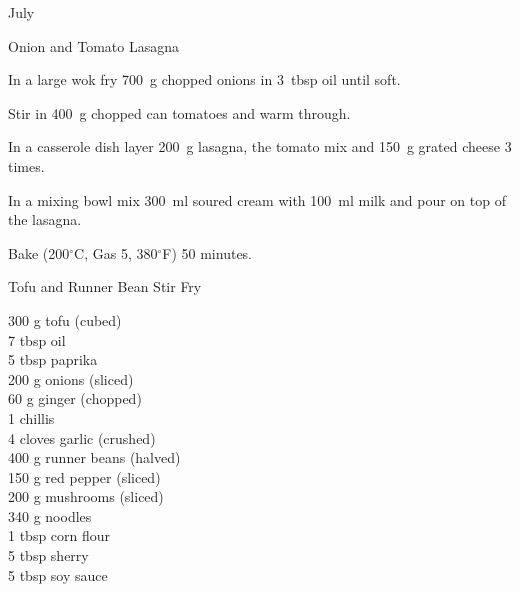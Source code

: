 \begin{menu}{July}
\begin{recipe}{2}{Onion and Tomato Lasagna}
\begin{ingredients}
		\end{ingredients}
	
	
	
    \begin{instructions}
    \item 
        In a large wok fry
        700~g chopped onions
        in
        3~tbsp  oil
        until soft.
      \item 
        Stir in 400~g chopped can tomatoes
        and warm through.
      \item 
        In a casserole dish layer
        200~g  lasagna,
        the tomato mix and
        150~g grated cheese
        3 times.
      \item 
        In a mixing bowl mix
        300~ml  soured cream
        with
        100~ml  milk
        and pour on top of the lasagna.
      \item 
        Bake (200$^{\circ}$C, Gas 5, 380$^{\circ}$F) 50 minutes.
      
    \end{instructions}
    \end{recipe}%
  
    \begin{recipe}{2}{Tofu and Runner Bean Stir Fry}%
		\begin{ingredients}
		300 g tofu (cubed) \\
	7 tbsp oil  \\
	5 tbsp paprika  \\
	200 g onions (sliced) \\
	60 g ginger (chopped) \\
	1  chillis  \\
	4 cloves garlic (crushed) \\
	400 g runner beans (halved) \\
	150 g red pepper (sliced) \\
	200 g mushrooms (sliced) \\
	340 g noodles  \\
	1 tbsp corn flour  \\
	5 tbsp sherry  \\
	5 tbsp soy sauce  \\
	
		\end{ingredients}
	
	

\end{recipe}
\end{menu}
